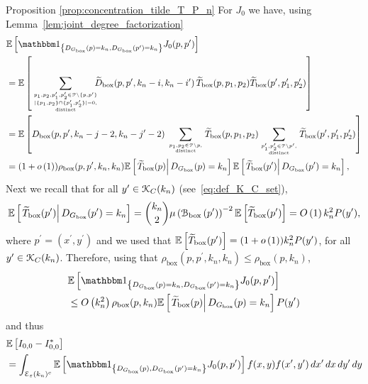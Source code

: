 \begin{proofof}{Proposition \ref{prop:concentration_tilde_T_P_n}}
For $J_0$ we have, using Lemma~\ref{lem:joint_degree_factorization}
\begin{align*}
	&\Exp{\ind{\Dbox(p) = k_n, \Dbox(p^\prime) = k_n} J_0(p,p^\prime)}\\
	&= \Exp{\sum_{{p_1, p_2, p_1^\prime, p_2^\prime \in \Pcal \setminus \{p,p^\prime\} 
		\atop |\{p_1, p_2\} \cap \{p_1^\prime, p_2^\prime\}| = 0,} \atop \text{distinct}}
		\hspace{-7pt} \widetilde{D}_{\text{box}}(p,p^\prime, k_n-i,k_n- i^\prime) \,
		\widetilde{T}_{\text{box}}(p,p_1,p_2) \widetilde{T}_{\text{box}}(p^\prime, p_1^\prime, p_2^\prime)}\\
	&= \Exp{D_{\text{box}}(p,p^\prime, k_n-j-2,k_n- j^\prime-2) \, \sum_{p_1,p_2 \in \Pcal \setminus p, \atop \text{distinct}}
		\widetilde{T}_{\text{box}}(p,p_1,p_2)
		\sum_{p_1^\prime,p_2^\prime \in \Pcal \setminus p^\prime, \atop \text{distinct}} 
			\widetilde{T}_{\text{box}}(p^\prime,p_1^\prime,p_2^\prime)}\\
	&= (1+\smallO{1})\rho_{\text{box}}(p,p^\prime,k_n,k_n) \CExp{\widetilde{T}_{\text{box}}(p)}{\Dbox(p) = k_n}
		\CExp{\widetilde{T}_{\text{box}}(p^\prime)}{\Dbox(p^\prime) = k_n},
\end{align*}
Next we recall that for all $y^\prime \in {\mathcal K}_{C}(k_n)$ (see~\eqref{eq:def_K_C_set}), 
\[
	\mathbb{E}\left[\left.\widetilde{T}_{\text{box}}(p^\prime)\right|D_{G_{\mathrm{box}}}(p^\prime) = k_n\right] = \binom{k_n}{2} \mu\left({\mathcal B}_{\text{box}}\left(p^\prime\right)\right)^{-2} \mathbb{E}\left[\widetilde{T}_{\text{box}}(p^\prime)\right] = O\left(1\right)k_n^2 P(y^\prime),
\] 
where $p^\prime = (x^\prime, y^\prime)$ and we used that $\mathbb{E}\left[\widetilde{T}_{\text{box}}(p^\prime)\right] = (1+o\left(1\right)) k_n^2 P(y^\prime)$, for all $y^\prime \in {\mathcal K}_{C}(k_n)$. Therefore, using that $\rho_{\text{box}}(p,p^\prime,k_n,k_n) \le \rho_{\text{box}}(p,k_n)$,
\begin{align*}
	&\Exp{\ind{\Dbox(p) = k_n, \Dbox(p^\prime) = k_n} J_0(p,p^\prime)}\\
	&\le \bigO{k_n^2} \rho_{\text{box}}(p,k_n) \CExp{\widetilde{T}_{\text{box}}(p)}{\Dbox(p) = k_n} P(y^\prime)
\end{align*}
and thus
\begin{align*}
	&\Exp{I_{0,0} - I_{0,0}^\ast}\\
	&= \int_{\mathcal{E}_\varepsilon(k_n)^c}
		\Exp{\ind{\Dbox(p), \Dbox(p^\prime) = k_n} J_0(p,p^\prime)} f(x,y) f(x^\prime,y^\prime) \, dx^\prime \, dx \, dy^\prime \, dy\\

\end{align*}
\end{proofof}
